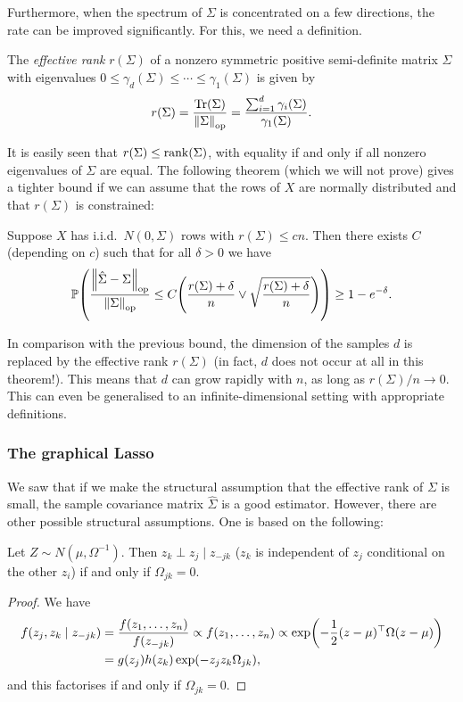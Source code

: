 Furthermore, when the spectrum of $\Sigma$ is concentrated on a few directions, the rate can be improved significantly. For this, we need a definition.
\begin{definition}
	The \emph{effective rank} $r(\Sigma)$ of a nonzero symmetric positive semi-definite matrix $\Sigma$ with eigenvalues $0 \leq \gamma_d(\Sigma) \leq \dotsb \leq \gamma_1(\Sigma)$ is given by
	\[
	r(\Sigma) = \frac{\Tr(\Sigma)}{\norm{\Sigma}_\mathrm{op}} = \frac{\sum_{i=1}^d \gamma_i(\Sigma)}{\gamma_1(\Sigma)}. 
	\]
\end{definition}
It is easily seen that $r(\Sigma) \leq \mathrm{rank}(\Sigma)$, with equality if and only if all nonzero eigenvalues of $\Sigma$ are equal. The following theorem (which we will not prove) gives a tighter bound if we can assume that the rows of $X$ are normally distributed and that $r(\Sigma)$ is constrained:
\begin{theorem}
	Suppose $X$ has i.i.d.\ $N(0, \Sigma)$ rows with $r(\Sigma) \leq cn$. Then there exists $C$ (depending on $c$) such that for all $\delta > 0$ we have
	\[
	\mathbb P\qty(\frac{\norm{\hat\Sigma - \Sigma}_\mathrm{op}}{\norm{\Sigma}_\mathrm{op}} \leq C \qty(\frac{r(\Sigma) + \delta}{n} \lor \sqrt{\frac{r(\Sigma) + \delta}{n}})) \geq 1 - e^{-\delta}. 
	\]
\end{theorem}

In comparison with the previous bound, the dimension of the samples $d$ is replaced by the effective rank $r(\Sigma)$ (in fact, $d$ does not occur at all in this theorem!). This means that $d$ can grow rapidly with $n$, as long as $r(\Sigma)/n \to 0$. This can even be generalised to an infinite-dimensional setting with appropriate definitions. 

\subsubsection{The graphical Lasso}
We saw that if we make the structural assumption that the effective rank of $\Sigma$ is small, the sample covariance matrix $\hat\Sigma$ is a good estimator. However, there are other possible structural assumptions. 
One is based on the following:
\begin{proposition}
	Let $Z \sim N(\mu, \Omega^{-1})$. Then $z_k \perp z_j \mid z_{-jk}$ ($z_k$ is independent of $z_j$ conditional on the other $z_i$) if and only if $\Omega_{jk} =0 $.  
\end{proposition}

\begin{proof}
	We have
	\begin{align*}
		f(z_j, z_k \mid z_{-jk}) &= \frac{f(z_1, \dotsc, z_n)}{f(z_{-jk})} \propto f(z_1, \dotsc, z_n) \propto \exp(-\frac12 (z-\mu)^\top \Omega(z-\mu)) \\
		&= g(z_j) h(z_k) \exp(- z_j z_k \Omega_{jk}), 
	\end{align*}
and this factorises if and only if $\Omega_{jk} = 0$. 
\end{proof}

